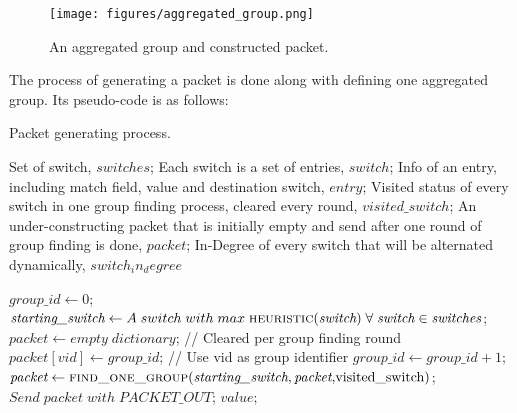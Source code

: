 \begin{figure}[H]
\begin{center}
\texttt{[image: figures/aggregated\_group.png]}
\end{center}
\caption{An aggregated group and constructed packet. }
\label{aggregated_group}
\end{figure}

The process of generating a packet is done along with defining one aggregated group. Its pseudo-code is as follows:

\begin {tcolorbox}[blanker,float=tbp,
grow to left by=1cm, grow to right by=1cm]
\begin{algorithm}[H]

  \caption{Packet generating process.}
  \begin{algorithmic}[1]
    \Require
      Set of switch, $switches$;  \newline
      Each switch is a set of entries, $switch$;  \newline
      Info of an entry, including match field, value and destination switch, $entry$;  \newline
      Visited status of every switch in one group finding process, cleared every round, $visited\_switch$;  \newline
      An under-constructing packet that is initially empty and send after one round of group finding is done, $packet$; \newline
      In-Degree of every switch that will be alternated dynamically, $switch_in_degree$
      
      \State $\textit{group\_id} \gets 0$;
            \State $\textit{starting\_switch} \gets A\;switch\;with\;max\;\Call{heuristic}{\textit{switch}}\;\forall\;\textit{switch} \in \textit{switches}$;
            \State $\textit{packet} \gets empty\;dictionary$;   // Cleared per group finding round
            \State $packet[vid] \gets \textit{group\_id}$;   // Use vid as group identifier 
            \State $group\_id \gets \textit{group\_id} + 1$;
            \State $\textit{packet} \gets \Call{find\_one\_group}{\textit{starting\_switch}, \textit{packet},$visited\_switch$}$;
            \State $Send\;\textit{packet}\;with\;PACKET\_OUT$;
      \EndWhile
    \EndFunction
    \State
      \State \Return $value$;
    \EndFunction
    \State
  \end{algorithmic}
\end{algorithm}
\end{tcolorbox}

